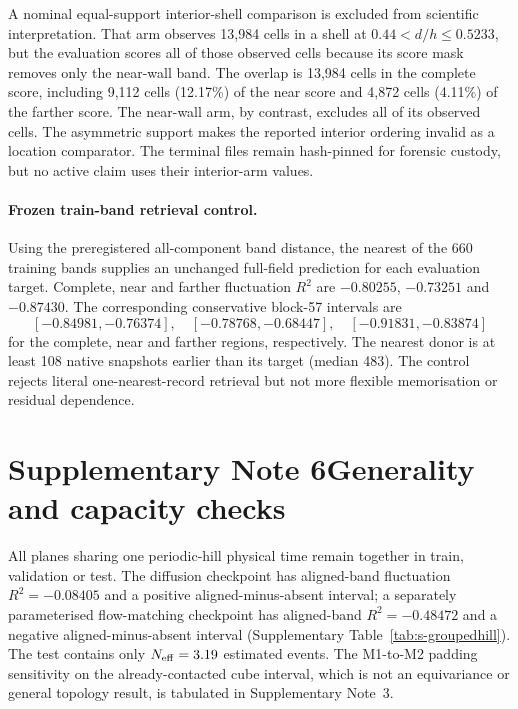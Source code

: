 \documentclass[11pt]{article}
\begin{document}
A nominal equal-support interior-shell comparison is excluded from scientific interpretation.
That arm observes 13,984 cells in a shell at
$0.44<d/h\leq0.5233$, but the evaluation scores all of those observed cells because its score mask
removes only the near-wall band. The overlap is 13,984 cells in the complete score, including
9,112 cells (12.17\%) of the near score and 4,872 cells (4.11\%) of the farther score. The
near-wall arm, by contrast, excludes all of its observed cells. The asymmetric support makes the
reported interior ordering invalid as a location comparator. The terminal files remain
hash-pinned for forensic custody, but no active claim uses their interior-arm values.

\paragraph{Frozen train-band retrieval control.}
Using the preregistered all-component band distance, the nearest of the 660 training bands supplies
an unchanged full-field prediction for each evaluation target. Complete, near and farther
fluctuation $R^2$ are $-0.80255$, $-0.73251$ and $-0.87430$. The corresponding conservative
block-57 intervals are
\[
[-0.84981,-0.76374],\quad [-0.78768,-0.68447],\quad
[-0.91831,-0.83874]
\]
for the complete, near and farther regions, respectively. The nearest donor is at least 108
native snapshots earlier than its target
(median 483). The control rejects literal one-nearest-record retrieval but not more flexible
memorisation or residual dependence.

\section*{Supplementary Note 6\quad Generality and capacity checks}\label{sec:s-support}

All planes sharing one periodic-hill physical time remain together in train, validation or test.
The diffusion checkpoint has aligned-band fluctuation $R^2=-0.08405$ and a positive
aligned-minus-absent interval; a separately parameterised flow-matching checkpoint has
aligned-band $R^2=-0.48472$ and a negative aligned-minus-absent interval
(Supplementary Table~\ref{tab:s-groupedhill}). The test contains only $N_{\rm eff}=3.19$
estimated events. The M1-to-M2 padding sensitivity on the already-contacted cube interval, which
is not an equivariance or general topology result, is tabulated in Supplementary Note~3.
\end{document}
